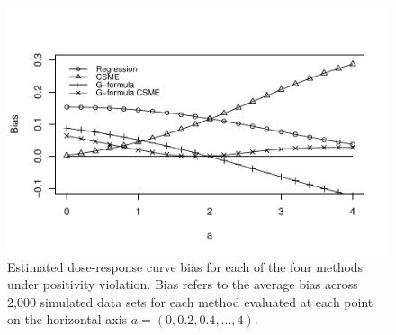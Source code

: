 \documentclass[12pt]{article}
\begin{document}
\newpage

\begin{figure}
\centering
\includegraphics[width=6in]{app_fig2.pdf}
\caption{Estimated dose-response curve bias for each of the four methods under positivity violation. Bias refers to the average bias across 2,000 simulated data sets for each method evaluated at each point on the horizontal axis $a = (0, 0.2, 0.4, ..., 4)$.}
\end{figure}

\clearpage
\newpage



\end{document}
